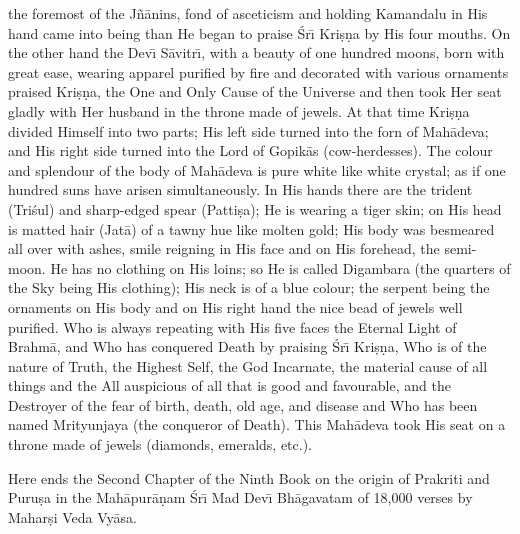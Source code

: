 the foremost of the J\~n\=anins, fond of asceticism and holding Kamandalu in His hand came into being than He began to praise \'Sr\={\i} Kri\d{s}\d{n}a by His four mouths. On the other hand the Dev\={\i} S\=avitr\={\i}, with a beauty of one hundred moons, born with great ease, wearing apparel purified by fire and decorated with various ornaments praised Kri\d{s}\d{n}a, the One and Only Cause of the Universe and then took Her seat gladly with Her husband in the throne made of jewels. At that time Kri\d{s}\d{n}a divided Himself into two parts; His left side turned into the forn of Mah\=adeva; and His right side turned into the Lord of Gopik\=as (cow-herdesses). The colour and splendour of the body of Mah\=adeva is pure white like white crystal; as if one hundred suns have arisen simultaneously. In His hands there are the trident (Tri\'sul) and sharp-edged spear (Patti\d{s}a); He is wearing a tiger skin; on His head is matted hair (Jat\=a) of a tawny hue like molten gold; His body was besmeared all over with ashes, smile reigning in His face and on His forehead, the semi-moon. He has no clothing on His loins; so He is called Digambara (the quarters of the Sky being His clothing); His neck is of a blue colour; the serpent being the ornaments on His body and on His right hand the nice bead of jewels well purified. Who is always repeating with His five faces the Eternal Light of Brahm\=a, and Who has conquered Death by praising \'Sr\={\i} Kri\d{s}\d{n}a, Who is of the nature of Truth, the Highest Self, the God Incarnate, the material cause of all things and the All auspicious of all that is good and favourable, and the Destroyer of the fear of birth, death, old age, and disease and Who has been named Mrityunjaya (the conqueror of Death). This Mah\=adeva took His seat on a throne made of jewels (diamonds, emeralds, etc.).

Here ends the Second Chapter of the Ninth Book on the origin of Prakriti and Puru\d{s}a in the Mah\=apur\=a\d{n}am \'Sr\={\i} Mad Dev\={\i} Bh\=agavatam of 18,000 verses by Mahar\d{s}i Veda Vy\=asa.



